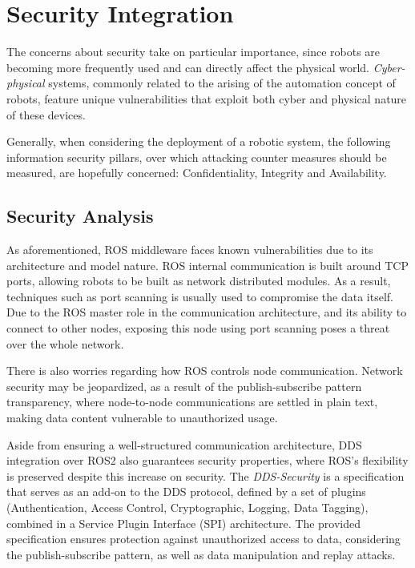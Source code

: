 \section{Security Integration}

The concerns about security take on particular importance, since robots are becoming more frequently used and can directly affect the physical world. \textit{Cyber-physical} systems, commonly related to the arising of the automation concept of robots, feature unique vulnerabilities that exploit both cyber and physical nature of these devices. \cite{mcclean2013preliminary}

Generally, when considering the deployment of a robotic system, the following information security pillars, over which attacking counter measures should be measured, are hopefully concerned: Confidentiality, Integrity and Availability. \cite{white2018procedurally}

\subsection{Security Analysis}

As aforementioned, ROS middleware faces known vulnerabilities due to its architecture and model nature. ROS internal communication is built around TCP ports, allowing robots to be built as network distributed modules. As a result, techniques such as port scanning is usually used to compromise the data itself. Due to the ROS master role in the communication architecture, and its ability to connect to other nodes, exposing this node using port scanning poses a threat over the whole network. \cite{8794451} 

There is also worries regarding how ROS controls node communication. Network security may be jeopardized, as a result of the publish-subscribe pattern transparency, where node-to-node communications are settled in plain text, making data content vulnerable to unauthorized usage. \cite{kim2018security}

Aside from ensuring a well-structured communication architecture, DDS integration over ROS2 also guarantees security properties, where ROS's flexibility is preserved despite this increase on security. The \textit{DDS-Security} \cite{dds-s} is a specification that serves as an add-on to the DDS protocol, defined by a set of plugins (Authentication, Access Control, Cryptographic, Logging, Data Tagging), combined in a Service Plugin Interface (SPI) architecture. The provided specification ensures protection against unauthorized access to data, considering the publish-subscribe pattern, as well as data manipulation and replay attacks. \cite{8442103, ros-dds-integration}

